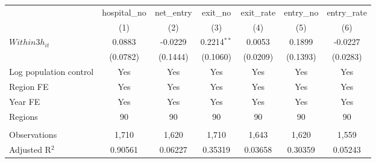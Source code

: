 \begingroup
\centering
\begin{tabular}{lcccccc}
   \toprule
                          & hospital\_no  & net\_entry  & exit\_no      & exit\_rate  & entry\_no  & entry\_rate \\    
                          & (1)           & (2)         & (3)           & (4)         & (5)        & (6)\\  
   \midrule 
   $Within3h_{it}$        & 0.0883        & -0.0229     & 0.2214$^{**}$ & 0.0053      & 0.1899     & -0.0227\\   
                          & (0.0782)      & (0.1444)    & (0.1060)      & (0.0209)    & (0.1393)   & (0.0283)\\   
   Log population control & Yes           & Yes         & Yes           & Yes         & Yes        & Yes\\  
   Region FE              & Yes           & Yes         & Yes           & Yes         & Yes        & Yes\\  
   Year FE                & Yes           & Yes         & Yes           & Yes         & Yes        & Yes\\  
   Regions                & 90            & 90          & 90            & 90          & 90         & 90\\  
    \\
   Observations           & 1,710         & 1,620       & 1,710         & 1,643       & 1,620      & 1,559\\  
   Adjusted R$^2$         & 0.90561       & 0.06227     & 0.35319       & 0.03658     & 0.30359    & 0.05243\\  
   \bottomrule
\end{tabular}
\par\endgroup
